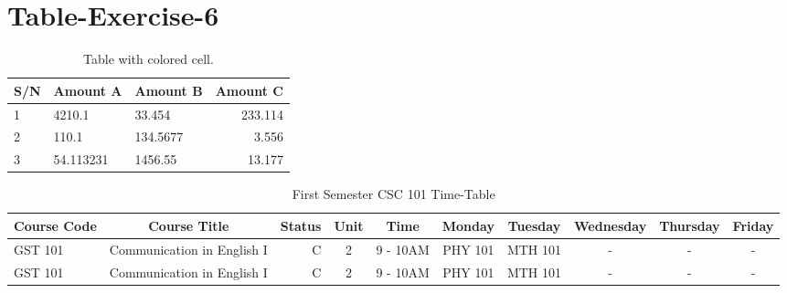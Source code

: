 \documentclass{article}
\begin{document}
\section{Table-Exercise-6}
\begin{table}[h!]
	\begin{center}
		\caption{Table with colored cell.}
		\label{tab:table1}
		\begin{tabular}{l|l|l|r}
			\hline
			\textbf{S/N} & \textbf{Amount A} & \textbf{Amount B} & \textbf{Amount C}\\
			\hline
			\cellcolor{blue!25}1 & 4210.1 & 33.454 & 233.114\\
			\cellcolor{green!20}2 & 110.1 & 134.5677 & 3.556\\
			\cellcolor{red!35}3 & 54.113231 & 1456.55 & 13.177\\
			\hline
		\end{tabular}
		\end{center}
\end{table}
\newpage
\begin{sidewaystable}
	\begin{center}
		\caption{First Semester CSC  101 Time-Table}
		\label{tab:table1}
		\begin{tabular}{l|c|r|c|c|c|c|c|c|c}
			\textbf{Course Code} & \textbf{Course Title} & \textbf{Status} & \textbf{Unit} & \textbf{Time} & \textbf{Monday} & \textbf{Tuesday} & \textbf{Wednesday} & \textbf{Thursday} & \textbf{Friday}\\
			\hline
			GST 101 & Communication in English I & C & 2 & 9 - 10AM & PHY 101 & MTH 101 & - & - & - \\
			\hline
			GST 101 & Communication in English I & C & 2 & 9 - 10AM & PHY 101 & MTH 101 & - & - & - \\
			\end{tabular}
		\end{center}
\end{sidewaystable}
	
\end{document}
